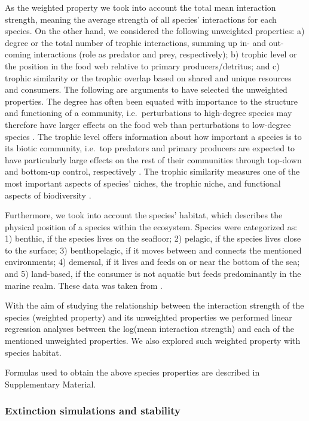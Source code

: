 \documentclass[gc, manuscript]{copernicus}
\begin{document}
As the weighted property we took into account the total mean interaction
strength, meaning the average strength of all species' interactions for
each species. On the other hand, we considered the following unweighted
properties: a) degree or the total number of trophic interactions,
summing up in- and out-coming interactions (role as predator and prey,
respectively); b) trophic level or the position in the food web relative
to primary producers/detritus; and c) trophic similarity or the trophic
overlap based on shared and unique resources and consumers. The
following are arguments to have selected the unweighted properties. The
degree has often been equated with importance to the structure and
functioning of a community, i.e.~perturbations to high-degree species
may therefore have larger effects on the food web than perturbations to
low-degree species \citetext{\citealp{Dunne2002a}; \citealp[references
in][]{Cirtwill2018a}}. The trophic level offers information about how
important a species is to its biotic community, i.e.~top predators and
primary producers are expected to have particularly large effects on the
rest of their communities through top-down and bottom-up control,
respectively \citep[references in][]{Cirtwill2018a}. The trophic
similarity measures one of the most important aspects of species'
niches, the trophic niche, and functional aspects of biodiversity
\citep{Martinez1991, Williams2000}.

Furthermore, we took into account the species' habitat, which describes
the physical position of a species within the ecosystem. Species were
categorized as: 1) benthic, if the species lives on the seafloor; 2)
pelagic, if the species lives close to the surface; 3) benthopelagic, if
it moves between and connects the mentioned environments; 4) demersal,
if it lives and feeds on or near the bottom of the sea; and 5)
land-based, if the consumer is not aquatic but feeds predominantly in
the marine realm. These data was taken from \citet{Jacob2011}.

With the aim of studying the relationship between the interaction
strength of the species (weighted property) and its unweighted
properties we performed linear regression analyses between the log(mean
interaction strength) and each of the mentioned unweighted properties.
We also explored such weighted property with species habitat.

Formulas used to obtain the above species properties are described in
Supplementary Material.

\subsubsection{Extinction simulations and stability}
\end{document}
